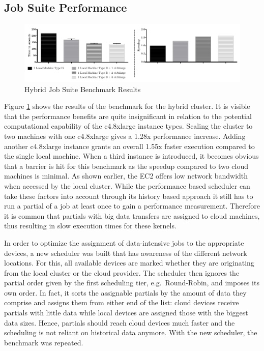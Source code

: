 \subsection*{Job Suite Performance}

\begin{figure}[H]
	\includegraphics[width=1.0\textwidth]{images/hybrid_full_benchmark_performance_based.pdf}
	\centering
	\caption{Hybrid Job Suite Benchmark Results}
	\label{img:hybrid_benchmark_results}
\end{figure}

Figure \ref{img:hybrid_benchmark_results} shows the results of the benchmark for the hybrid cluster. It is visible that the performance benefits are quite insignificant in relation to the potential computational capability of the c4.8xlarge instance types. Scaling the cluster to two machines with one c4.8xlarge gives a 1.28x performance increase. Adding another c4.8xlarge instance grants an overall 1.55x faster execution compared to the single local machine. When a third instance is introduced, it becomes obvious that a barrier is hit for this benchmark as the speedup compared to two cloud machines is minimal. As shown earlier, the EC2 offers low network bandwidth when accessed by the local cluster. While the performance based scheduler can take these factors into account through its history based approach it still has to run a partial of a job at least once to gain a performance measurement. Therefore it is common that partials with big data transfers are assigned to cloud machines, thus resulting in slow execution times for these kernels.

In order to optimize the assignment of data-intensive jobs to the appropriate devices, a new scheduler was built that has awareness of the different network locations. For this, all available devices are marked whether they are originating from the local cluster or the cloud provider. The scheduler then ignores the partial order given by the first scheduling tier, e.g.~Round-Robin, and imposes its own order. In fact, it sorts the assignable partials by the amount of data they comprise and assigns them from either end of the list: cloud devices receive partials with little data while local devices are assigned those with the biggest data sizes. Hence, partials should reach cloud devices much faster and the scheduling is not reliant on historical data anymore. With the new scheduler, the benchmark was repeated.

